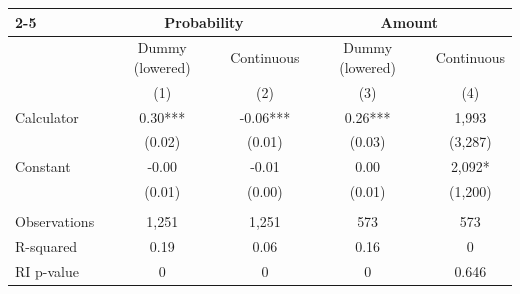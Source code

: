 \begin{tabular}{lcccc}
\cmidrule{2-5}      & \multicolumn{2}{c|}{Probability} & \multicolumn{2}{c}{Amount } \\
\midrule
      & Dummy (lowered) & \multicolumn{1}{c|}{Continuous} & Dummy (lowered) & Continuous \\
\midrule
      & (1)   & (2)   & (3)   & (4) \\
Calculator & 0.30*** & -0.06*** & 0.26*** & 1,993 \\
      & (0.02) & (0.01) & (0.03) & (3,287) \\
Constant & -0.00 & -0.01 & 0.00  & 2,092* \\
      & (0.01) & (0.00) & (0.01) & (1,200) \\
      &       &       &       &  \\
\midrule
Observations & 1,251 & 1,251 & 573   & 573 \\
R-squared & 0.19  & 0.06  & 0.16  & 0 \\
RI p-value & 0     & 0     & 0     & 0.646 \\
\bottomrule
\bottomrule
\end{tabular}%
